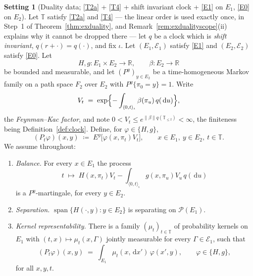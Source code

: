 \documentclass[11pt,a4paper]{article}
\theoremstyle{plain}
\theoremstyle{definition}
\newtheorem{setting}[theorem]{Setting}
\theoremstyle{remark}
\newcommand{\R}{\mathbb{R}}
\newcommand{\T}{\mathbb{T}}                     %
\newcommand{\Prob}{\mathcal{P}}                %
\newcommand{\dif}{\,\mathrm{d}}
\begin{document}
\begin{setting}[Duality data; \eqref{T2a} + \eqref{T4} + shift invariant clock + \eqref{E1} on $E_1$, \eqref{E0} on $E_2$]
  \label{set:dualdata}
  Let $\T$ satisfy \eqref{T2a} and \eqref{T4} --- the linear order is used exactly once, in
  Step~1 of Theorem~\ref{thm:exduality}, and
  Remark~\ref{rem:exdualityscope}(ii) explains why it cannot be dropped there ---
  let $q$ be a clock which is \emph{shift invariant},
  $q(r + \cdot) = q(\cdot)$, and fix $\iota$.  Let $(E_1,\mathcal{E}_1)$ satisfy \eqref{E1} and $(E_2,\mathcal{E}_2)$
  satisfy \eqref{E0}.  Let
  \[
    H, g : E_1 \times E_2 \to \R , \qquad \beta : E_2 \to \R
  \]
  be bounded and measurable, and let $(P^y)_{y \in E_2}$ be a time-homogeneous
  Markov family on a path space $F_2$ over $E_2$ with $P^y\{\pi_0 = y\} = 1$.
  Write
  \begin{equation}
    \label{eq:FKfactor}
    V_t \;=\; \exp\Bigl\{ - \int_{\langle 0,t \rangle_\iota} \beta(\pi_u) \, q(\dif u) \Bigr\} ,
  \end{equation}
  the \emph{Feynman--Kac factor}, and note $0 < V_t \leq e^{\lVert\beta\rVert q(\T_{\leq t})} < \infty$,
  the finiteness being Definition~\ref{def:clock}.  Define, for
  $\varphi \in \{H,g\}$,
  \begin{equation}
    \label{eq:dualsemigroup}
    (P_t\varphi)(x,y) \;\coloneqq\; E^y\bigl[ \varphi(x,\pi_t) V_t \bigr] ,
    \qquad x \in E_1, \ y \in E_2, \ t \in \T .
  \end{equation}
  We assume throughout:
  \begin{enumerate}[label=(D\arabic*)]
  \item \label{it:D1}
    \emph{Balance.}  For every $x \in E_1$ the process
    \[
      t \;\longmapsto\; H(x,\pi_t) V_t
        - \int_{\langle 0,t\rangle_\iota} g(x,\pi_u) V_u \, q(\dif u)
    \]
    is a $P^y$-martingale, for every $y \in E_2$.
  \item \label{it:D2}
    \emph{Separation.}  $\operatorname{span}\{H(\cdot,y) : y \in E_2\}$ is
    separating on $\Prob(E_1)$.
  \item \label{it:D3}
    \emph{Kernel representability.}  There is a family $(\mu_t)_{t \in \T}$ of
    probability kernels on $E_1$ with $(t,x) \mapsto \mu_t(x,\Gamma)$ jointly
    measurable for every $\Gamma \in \mathcal{E}_1$, such that
    \[
      (P_t\varphi)(x,y) \;=\; \int_{E_1} \mu_t(x,\dif x') \, \varphi(x',y) ,
      \qquad \varphi \in \{H,g\} ,
    \]
    for all $x,y,t$.
  \end{enumerate}
\end{setting}
\end{document}
